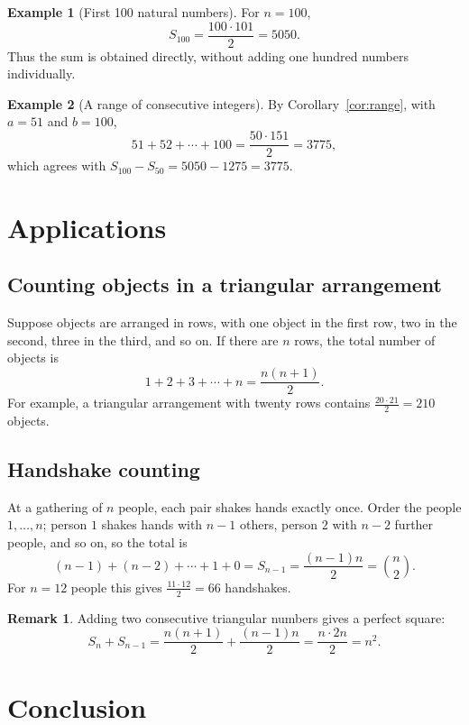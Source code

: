\documentclass[12pt,a4paper]{article}
\theoremstyle{definition}
\newtheorem{example}{Example}
\newtheorem{remark}{Remark}
\begin{document}
\begin{example}[First 100 natural numbers]
For $n=100$,
\[
S_{100}=\frac{100\cdot 101}{2}=5050.
\]
Thus the sum is obtained directly, without adding one hundred numbers individually.
\end{example}
 
\begin{example}[A range of consecutive integers]
By Corollary~\ref{cor:range}, with $a=51$ and $b=100$,
\[
51+52+\cdots+100=\frac{50\cdot 151}{2}=3775,
\]
which agrees with $S_{100}-S_{50}=5050-1275=3775$.
\end{example}
 
\section{Applications}\label{sec:applications}
 
\subsection{Counting objects in a triangular arrangement}
 
Suppose objects are arranged in rows, with one object in the first row, two in the second, three in the third, and so on. If there are $n$ rows, the total number of objects is
\[
1+2+3+\cdots+n=\frac{n(n+1)}{2}.
\]
For example, a triangular arrangement with twenty rows contains $\frac{20\cdot 21}{2}=210$ objects.
 
\subsection{Handshake counting}
 
At a gathering of $n$ people, each pair shakes hands exactly once. Order the people $1,\ldots,n$; person $1$ shakes hands with $n-1$ others, person $2$ with $n-2$ further people, and so on, so the total is
\[
(n-1)+(n-2)+\cdots+1+0=S_{n-1}=\frac{(n-1)n}{2}=\binom{n}{2}.
\]
For $n=12$ people this gives $\frac{11\cdot12}{2}=66$ handshakes.
 
\begin{remark}
Adding two consecutive triangular numbers gives a perfect square:
\[
S_n+S_{n-1}=\frac{n(n+1)}{2}+\frac{(n-1)n}{2}=\frac{n\cdot 2n}{2}=n^2.
\]
\end{remark}
 
\section{Conclusion}
 
\end{document}

